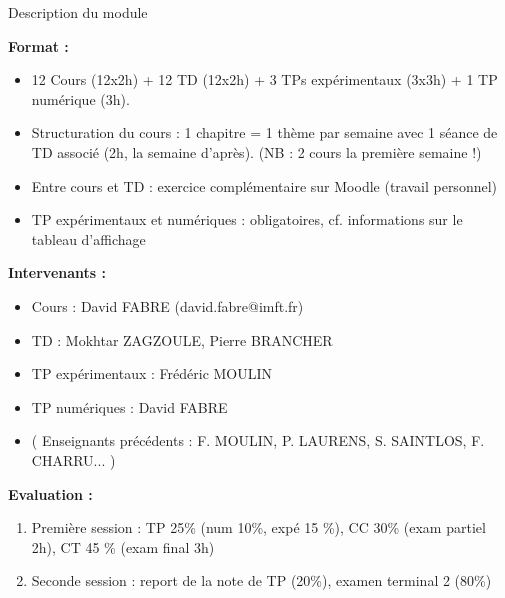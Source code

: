 \begin{frame}{Description du module}

\small


\textbf{Format :} \medskip

\begin{itemize}
\item[\checkmark]
	12 Cours (12x2h) + 12 TD (12x2h) + 3 TPs expérimentaux (3x3h) + 1 TP numérique (3h).
\item[\checkmark]
	Structuration du cours : 1 chapitre = 1 thème par semaine 
	 avec 1 séance de TD associé (2h, la semaine d'après).
	 (NB :  2 cours la première semaine !)
	
\item[\checkmark]
	Entre cours et TD : \textcolor{rouge}{exercice complémentaire} sur Moodle (travail personnel)
\item[\checkmark]
	TP expérimentaux et numériques : obligatoires, cf. informations sur le tableau d'affichage
\end{itemize}

\pause
\medskip

\textbf{Intervenants :} \medskip

\begin{itemize}
\item
	Cours : David FABRE (david.fabre@imft.fr)
\item
	TD : Mokhtar ZAGZOULE, Pierre BRANCHER
\item
	TP expérimentaux : Frédéric MOULIN
\item
	TP numériques : David FABRE
	
\item ( Enseignants précédents : F. MOULIN, P. LAURENS, S. SAINTLOS, F. CHARRU... )	
\end{itemize}

\pause
\medskip

\textbf{Evaluation :} \medskip

\begin{enumerate}
\item
	Première session : TP 25\% (num 10\%, expé 15 \%), CC 30\% (exam partiel 2h), CT 45 \% (exam final 3h)  
\item 
	Seconde session : report de la note de TP (20\%), examen terminal 2 (80\%)
\end{enumerate}

\vspace{5mm}

\end{frame}



